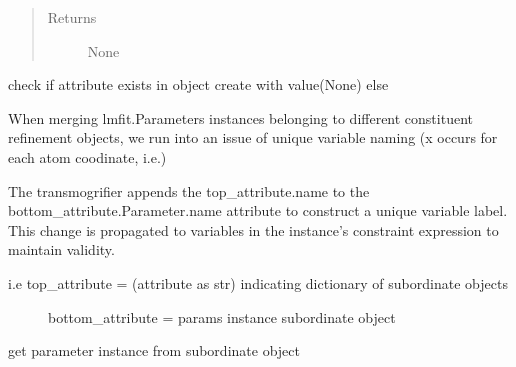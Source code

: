 \documentclass[letterpaper,10pt,english]{sphinxmanual}
\begin{document}
\begin{fulllineitems}
\begin{fulllineitems}
\begin{quote}
\begin{description}
\begin{itemize}
\end{itemize}

\item[{Returns}] \leavevmode
None

\end{description}\end{quote}

\end{fulllineitems}


\begin{fulllineitems}
\label{\detokenize{rst/utilities:mstack.utilities.MergeParams.exists}}
check if attribute exists in object \textbar{} create with value(None) else

\end{fulllineitems}


\begin{fulllineitems}
\label{\detokenize{rst/utilities:mstack.utilities.MergeParams.lower_to_upper}}
When merging lmfit.Parameters instances belonging to different constituent refinement
objects, we run into an issue of unique variable naming (x occurs for each atom coodinate,
i.e.)

The transmogrifier appends the top\_attribute.name to the bottom\_attribute.Parameter.name attribute
to construct a unique variable label. This change is propagated to variables in the instance's
constraint expression to maintain validity.
\begin{description}
\item[{i.e top\_attribute = (attribute as str) indicating dictionary of subordinate objects}] \leavevmode
bottom\_attribute = params instance subordinate object

\end{description}

\end{fulllineitems}


\begin{fulllineitems}
\label{\detokenize{rst/utilities:mstack.utilities.MergeParams.param_finder}}
get parameter instance from subordinate object


\end{fulllineitems}
\end{fulllineitems}
\end{document}

